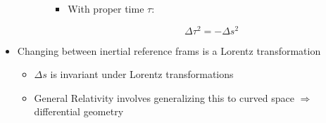 \begin{itemize}
\begin{itemize}
\begin{itemize}
\begin{itemize}
              \item With proper time $\tau$:

                $$\Delta \tau^2=-\Delta s^2$$

            \end{itemize}

        \end{itemize}

    \end{itemize}

  \item Changing between inertial reference frams is a Lorentz transformation

    \begin{itemize}

      \item $\Delta s$ is invariant under Lorentz transformations

      \item General Relativity involves generalizing this to curved space $\Rightarrow$ differential geometry

    \end{itemize}

\end{itemize}



